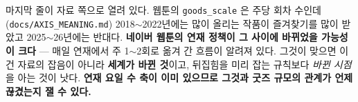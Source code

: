 \documentclass[10pt]{article}
\begin{document}
마지막 줄이 자료 쪽으로 열려 있다. 웹툰의 \texttt{goods\_scale} 은 주당
회차 수인데(\texttt{docs/AXIS\_MEANING.md}) 2018$\sim$2022년에는 많이
올리는 작품이 즐겨찾기를 많이 받았고 2025$\sim$26년에는 반대다.
\textbf{네이버 웹툰의 연재 정책이 그 사이에 바뀌었을 가능성이 크다} ---
매일 연재에서 주 1$\sim$2회로 옮겨 간 흐름이 알려져 있다. 그것이 맞으면
이건 자료의 잡음이 아니라 \textbf{세계가 바뀐 것}이고, 뒤집힘을 미리 잡는
규칙보다 \emph{바뀐 시점}을 아는 것이 낫다. \textbf{연재 요일 수 축이
이미 있으므로 그것과 굿즈 규모의 관계가 언제 끊겼는지 잴 수 있다.}
\end{document}
